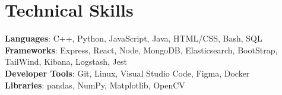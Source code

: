 \documentclass[a4paper,20pt]{article}
\begin{document}
%
\section{Technical Skills}
 \begin{itemize}[leftmargin=0.15in, label={}]
    \small{\item{
     \textbf{Languages}{: C++, Python, JavaScript, Java, HTML/CSS, Bash, SQL} \\
     \textbf{Frameworks}{: Express, React, Node, MongoDB, Elasticsearch, BootStrap, TailWind, Kibana, Logstash, Jest } \\
     \textbf{Developer Tools}{: Git, Linux, Visual Studio Code, Figma, Docker } \\
     \textbf{Libraries}{: pandas, NumPy, Matplotlib, OpenCV} \\
    }}
 \end{itemize}
 \vspace{-16pt}

 
\end{document}
